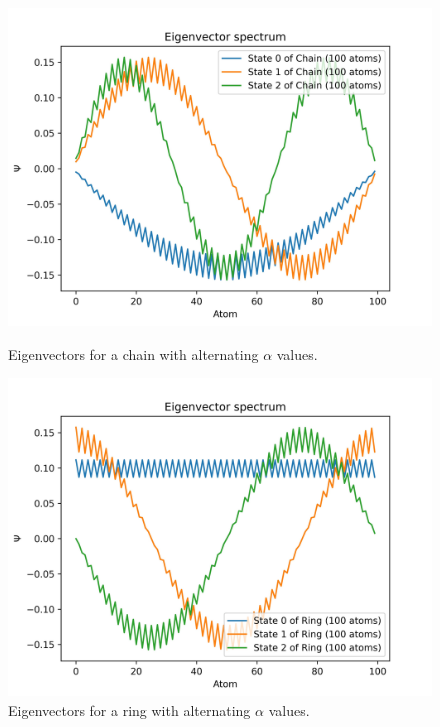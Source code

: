 \documentclass{article}
\begin{document}
\begin{figure}[h]
    \centering
    \begin{minipage}{0.45\textwidth}
        \centering
        \includegraphics[width=\textwidth]{Figures/chain_alpha_eigenvectors.jpg}
        \caption{Eigenvectors for a chain with alternating $\alpha$ values.}
        \label{fig:chain_alpha_eigenvectors}
    \end{minipage}
    \hfill
    \begin{minipage}{0.45\textwidth}
        \centering
        \includegraphics[width=\textwidth]{Figures/ring_alpha_eigenvectors.jpg}
        \caption{Eigenvectors for a ring with alternating $\alpha$ values.}
        \label{fig:ring_alpha_eigenvectors}

\end{minipage}
\end{figure}
\end{document}
